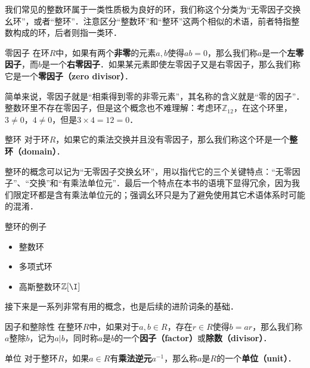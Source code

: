 


我们常见的整数环属于一类性质极为良好的环，我们称这个分类为“无零因子交换幺环”，或者“整环”．注意区分“整数环”和“整环”这两个相似的术语，前者特指整数构成的环，后者则指一类环．

\begin{definition}{零因子}
在环$R$中，如果有两个\textbf{非零}的元素$a, b$使得$ab=0$，那么我们称$a$是一个\textbf{左零因子}，而$b$是一个\textbf{右零因子}．如果某元素即使左零因子又是右零因子，那么我们称它是一个\textbf{零因子（zero divisor）}．
\end{definition}

简单来说，零因子就是“相乘得到零的非零元素”，其名称的含义就是“零的因子”．整数环里不存在零因子，但是这个概念也不难理解：考虑环$\mathbb{Z}_{12}$，在这个环里，$3\not=0$，$4\not=0$，但是$3\times 4=12=0$．

\begin{definition}{整环}
对于环$R$，如果它的乘法交换并且没有零因子，那么我们称这个环是一个\textbf{整环（domain）}．
\end{definition}

整环的概念可以记为“无零因子交换幺环”，用以指代它的三个关键特点：“无零因子”、“交换”和“有乘法单位元”．最后一个特点在本书的语境下显得冗余，因为我们限定环都是含有乘法单位元的；强调幺环只是为了避免使用其它术语体系时可能的混淆．

\begin{example}{整环的例子}
\begin{itemize}
\item 整数环
\item 多项式环
\item 高斯整数环$\mathbb{Z}[\I]$
\end{itemize}

\end{example}

接下来是一系列非常有用的概念，也是后续的进阶词条的基础．

\begin{definition}{因子和整除性}
在整环$R$中，如果对于$a, b\in R$，存在$r\in R$使得$b=ar$，那么我们称$a$整除$b$，记为$a|b$，同时称$a$是$b$的一个\textbf{因子（factor）}或\textbf{除数（divisor）}．
\end{definition}

\begin{definition}{单位}
对于整环$R$，如果$a\in R$有\textbf{乘法逆元}$a^{-1}$，那么称$a$是$R$的一个\textbf{单位（unit）}．
\end{definition}

